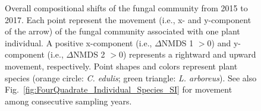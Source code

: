 \clearpage
\begin{figure}[h]
	\centering
	\caption[Overall compositional shifts of the fungal community from 2015 to 2017.]
		{\hspace{1mm} Overall compositional shifts of the fungal community from 2015 to 2017. Each point represent the movement (i.e., x- and y-component of the arrow) of the fungal community associated with one plant individual. A positive x-component (i.e., $\Delta$NMDS 1 $ > 0$) and y-component (i.e., $\Delta$NMDS 2 $ > 0$) represents a rightward and upward movement, respectively. Point shapes and colors represent plant species (orange circle: \textit{C. edulis}; green triangle: \textit{L. arboreus}). See also Fig.~\ref{fig:FourQuadrate_Individual_Species_SI} for movement among consecutive sampling years.
		}
	\label{fig:FourQuadrate_Individual_Species}
\end{figure}



